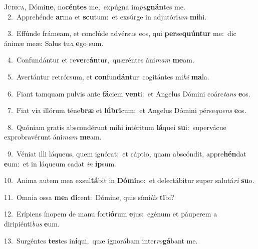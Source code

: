 \lettrine{\initial\textcolor{\initialcolor}{J}}{údica,} Dómi\-\textbf{ne}\-, no\-\textbf{cén}\-\textbf{tes} me,~\star expúgna im\-\textit{pu}\-\textbf{gnán}tes me.\\
{\numbfont\textcolor{\numbcolor}{~2.}}~Apprehénde \textbf{ar}\-ma et \textbf{scu}\-tum:~\star et exsúrge in adjutóri\textit{um} \textbf{mi}\-hi.\par
{\numbfont\textcolor{\numbcolor}{~3.}}~Effúnde frámeam, et conclúde advérsus eos, qui \textbf{per}\-se\-\textbf{quún}\-\textbf{tur} me:~\star dic ánimæ meæ: Salus tu\textit{a} \textbf{e}\-go sum.\par
{\numbfont\textcolor{\numbcolor}{~4.}}~Confundántur et re\-\textbf{ve}\-re\-\textbf{án}\-tur,~\star quæréntes áni\textit{mam} \textbf{me}\-am.\par
{\numbfont\textcolor{\numbcolor}{~5.}}~Avertántur retrórsum, et \textbf{con}\-fun\-\textbf{dán}\-tur~\star cogitántes mi\textit{hi} \textbf{ma}\-la.\par
{\numbfont\textcolor{\numbcolor}{~6.}}~Fiant tamquam pulvis ante \textbf{fá}\-ciem \textbf{ven}\-ti:~\star et Angelus Dómini coárc\textit{tans} \textbf{e}\-os.\par
{\numbfont\textcolor{\numbcolor}{~7.}}~Fiat via illórum téne\textbf{bræ} et \textbf{lú}\-\textbf{bri}cum:~\star et Angelus Dómini pérse\textit{quens} \textbf{e}\-os.\par
{\numbfont\textcolor{\numbcolor}{~8.}}~Quóniam gratis abscondérunt mihi intéritum \textbf{lá}\-quei \textbf{su}\-i:~\star supervácue exprobravérunt áni\textit{mam} \textbf{me}\-am.\par
{\numbfont\textcolor{\numbcolor}{~9.}}~Véniat illi láqueus, quem ignórat:~\dagger et cáptio, quam abscóndit, appre\-\textbf{hén}\-dat \textbf{e}\-um:~\star et in láqueum cadat \textit{in} \textbf{ip}\-sum.\par
{\numbfont\textcolor{\numbcolor}{10.}}~Anima autem mea exsul\-\textbf{tá}\-bit in \textbf{Dó}\-\textbf{mi}no:~\star et delectábitur super salutá\textit{ri} \textbf{su}\-o.\par
{\numbfont\textcolor{\numbcolor}{11.}}~Omnia ossa \textbf{me}\-a \textbf{di}\-cent:~\star Dómine, quis sími\textit{lis} \textbf{ti}\-bi?\par
{\numbfont\textcolor{\numbcolor}{12.}}~Erípiens ínopem de manu forti\-\textbf{ó}\-rum \textbf{e}\-jus:~\star egénum et páuperem a diripiénti\textit{bus} \textbf{e}\-um.\par
{\numbfont\textcolor{\numbcolor}{13.}}~Surgéntes \textbf{tes}\-tes in\-\textbf{í}\-qui,~\star quæ ignorábam inter\-\textit{ro}\-\textbf{gá}bant me.\par
